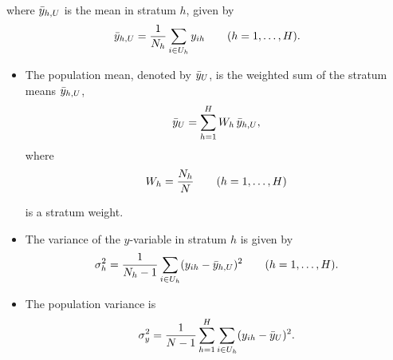 \documentclass{my_eth_beamer}
\numberwithin{equation}{section}
\begin{document}
\begin{frame}
    \hspace{1.75em} where $\bar{y}_{h,U}$ is the \alert{mean} in stratum $h$, given by
    \begin{equation*}
        \bar{y}_{h,U} = \frac{1}{N_{h}}\sum_{i \in U_h} y_{ih} \qquad
            (h = 1, \ldots, H).
    \end{equation*}

    \begin{itemize}
    \setlength{\itemsep}{10pt}
        \item The \alert{population mean}, denoted by $\bar{y}_U$, is the weighted
            sum of the stratum means $\bar{y}_{h,U}$,
            \begin{equation*}
                \bar{y}_U = \sum_{h = 1}^H W_h \, \bar{y}_{h,U},
            \end{equation*}
            \noindent where
            \begin{equation*}
                W_h = \frac{N_{h}}{N} \qquad (h = 1, \ldots, H)
            \end{equation*}

            \vspace{1em}

            \noindent is a \alert{stratum weight}.
    \end{itemize}
\end{frame}

\begin{frame}
    \begin{itemize}
    \setlength{\itemsep}{12pt}
        \item The \alert{variance} of the $y$-variable in stratum $h$ is
            given by
            \begin{equation*}
                \sigma_{h}^2 = \frac{1}{N_{h} - 1} \sum_{i \in U_h} (y_{ih} - \bar{y}_{h,U})^2
                \qquad (h = 1, \ldots, H).
            \end{equation*}
        \item The \alert{population variance} is
            \begin{equation*}
                {\ensuremath{\sigma_y^2}} = \frac{1}{N - 1}\sum_{h=1}^H \sum_{i \in U_h}
                    (y_{ih} - \bar{y}_U)^2.
            \end{equation*}
    \end{itemize}
\end{frame}
\end{document}
